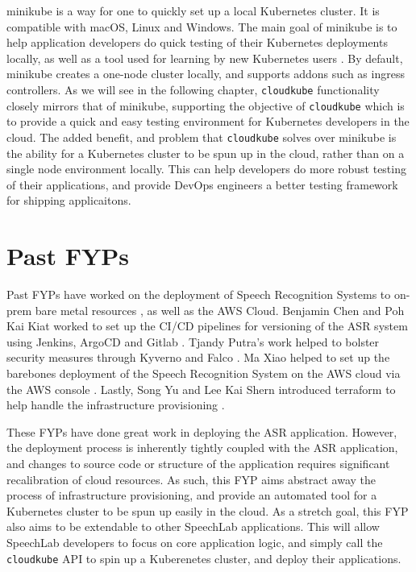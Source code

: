 minikube is a way for one to quickly set up a local Kubernetes cluster. It is compatible with macOS, Linux and Windows. The main goal of minikube is to help application developers do quick testing of their Kubernetes deployments locally, as well as a tool used for learning by new Kubernetes users \cite{minikube-docs}. By default, minikube creates a one-node cluster locally, and supports addons such as ingress controllers. As we will see in the following chapter, \texttt{cloudkube} functionality closely mirrors that of minikube, supporting the objective of \texttt{cloudkube} which is to provide a quick and easy testing environment for Kubernetes developers in the cloud. The added benefit, and problem that 
\texttt{cloudkube} solves over minikube is the ability for a Kubernetes cluster to be spun up in the cloud, rather than on a single node environment locally. This can help developers do more robust testing of their applications, and provide DevOps engineers a better testing framework for shipping applicaitons. 

\section{Past FYPs}
Past FYPs have worked on the deployment of Speech Recognition Systems to on-prem bare metal resources \cite{yap-2023}, as well as the AWS Cloud.
Benjamin Chen and Poh Kai Kiat worked to set up the CI/CD pipelines for versioning of the ASR system using Jenkins, ArgoCD and Gitlab \cite{chen-2021} \cite{poh-2022}. 
Tjandy Putra's work helped to bolster security measures through Kyverno and Falco \cite{putra-2023}. Ma Xiao helped to set up the 
barebones deployment of the Speech Recognition System on the AWS cloud via the AWS console \cite{ma-2021}. Lastly, Song Yu and Lee Kai Shern
introduced terraform to help handle the infrastructure provisioning \cite{song-yu-2023} \cite{lee-2022}. 

These FYPs have done great work in deploying the ASR application. However, the deployment process is inherently tightly coupled with the 
ASR application, and changes to source code or structure of the application requires significant recalibration of cloud resources. As such, this 
FYP aims abstract away the process of infrastructure provisioning, and provide an automated tool for a Kubernetes cluster to be spun up easily in the cloud. 
As a stretch goal, this FYP also aims to be extendable to other SpeechLab applications. This will allow SpeechLab developers to focus on core application logic, and 
simply call the \texttt{cloudkube} API to spin up a Kuberenetes cluster, and deploy their applications. 